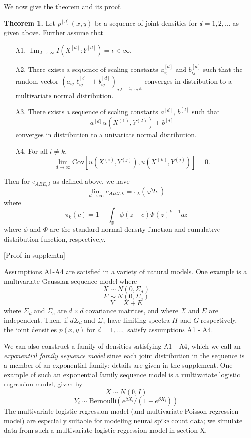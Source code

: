 \documentclass{article}
\newcommand{\Cov}{\text{Cov}}
\begin{document}
We now give the theorem and its proof.

\textbf{Theorem 1.} Let $p^{[d]}(x, y)$ be a sequence of joint densities
for $d = 1,2,\hdots$ as given above.  Further assume that
\begin{itemize}
\item[A1.] $\lim_{d \to \infty} I(X^{[d]}; Y^{[d]}) = \iota < \infty.$
\item[A2.] There exists a sequence of scaling constants $a_{ij}^{[d]}$
and $b_{ij}^{[d]}$ such that the random vector $(a_{ij}\ell_{ij}^{[d]} +
b_{ij}^{[d]})_{i, j = 1,\hdots, k}$ converges in distribution to a
multivariate normal distribution.
\item[A3.] There exists a sequence of scaling constants $a^{[d]}$, $b^{[d]}$ such that
\[
a^{[d]}u(X^{(1)}, Y^{(2)}) + b^{[d]}
\]
converges in distribution to a univariate normal distribution.
\item[A4.] For all $i \neq k$,
\[\lim_{d \to \infty}\Cov[u(X^{(i)}, Y^{(j)}), u(X^{(k)}, Y^{(j)})] = 0.\]
\end{itemize}
Then for $e_{ABE, k}$ as defined above, we have
\[
\lim_{d \to \infty} e_{ABE, k} = \pi_k(\sqrt{2 \iota})
\]
where
\[
\pi_k(c) = 1 - \int_{\mathbb{R}} \phi(z - c)  \Phi(z)^{k-1} dz
\]
where $\phi$ and $\Phi$ are the standard normal density function and
cumulative distribution function, respectively.


[Proof in supplemtn]

Assumptions A1-A4 are satisfied in a variety of natural models.
One example is a multivariate Gaussian sequence model where
\[
X \sim N(0, \Sigma_d)
\]
\[
E \sim N(0, \Sigma_e)
\]
\[
Y = X + E
\]
where $\Sigma_d$ and $\Sigma_e$ are $d \times d$ covariance matrices, and where $X$ and $E$ are independent.  Then, if $d \Sigma_d$ and $\Sigma_e$ have limiting spectra $H$ and $G$ respectively,
the joint densities $p(x, y)$ for $d = 1,\hdots, $ satisfy assumptions A1 - A4.

We can also construct a family of densities satisfying A1 - A4,
which we call an \emph{exponential family sequence model} since each joint distribution in the sequence
is a member of an exponential family: details are given in the supplement.
One example of such an exponential family sequence model is a multivariate logistic regression model,
given by
\[
X \sim N(0, I)
\]
\[
Y_i \sim \text{Bernoulli}(e^{\beta X_i}/(1 + e^{\beta X_i}))
\]
The multivariate logistic regression model (and multivariate Poisson regression model)
are especially suitable for modeling neural spike count data;
we simulate data from such a multivariate logistic regression model in section X.
\end{document}
